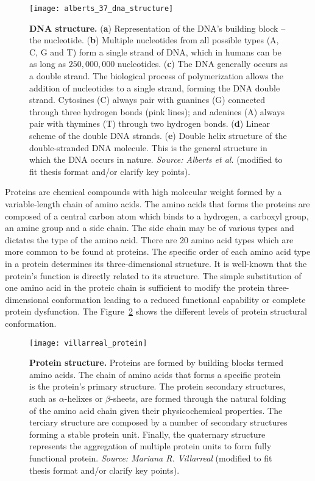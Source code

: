 \begin{figure}[h!]
\centering
\texttt{[image: alberts\_37\_dna\_structure]}
\caption[DNA structure]{\textbf{DNA structure.} (\textbf{a}) Representation of the DNA's building block -- the nucleotide. (\textbf{b}) Multiple nucleotides from all possible types (A, C, G and T) form a single strand of DNA, which in humans can be as long as \approxy$250,000,000$ nucleotides. (\textbf{c}) The DNA generally occurs as a double strand. The biological process of polymerization allows the addition of nucleotides to a single strand, forming the DNA double strand. Cytosines (C) always pair with guanines (G) connected through three hydrogen bonds (pink lines); and adenines (A) always pair with thymines (T) through two hydrogen bonds. (\textbf{d}) Linear scheme of the double DNA strands. (\textbf{e}) Double helix structure of the double-stranded DNA molecule. This is the general structure in which the DNA occurs in nature. \emph{Source: Alberts et al.}\cite{alberts2007} (modified to fit thesis format and/or clarify key points).}
\label{fig:alberts_dna_structure}
\end{figure}

Proteins are chemical compounds with high molecular weight formed by a variable-length chain of amino acids. The amino acids that forms the proteins are composed of a central carbon atom which binds to a hydrogen, a carboxyl group, an amine group and a side chain. The side chain may be of various types and dictates the type of the amino acid. There are 20 amino acid types which are more common to be found at proteins. The specific order of each amino acid type in a protein determines its three-dimensional structure. It is well-known that the protein's function is directly related to its structure. The simple substitution of one amino acid in the proteic chain is sufficient to modify the protein three-dimensional conformation leading to a reduced functional capability or complete protein dysfunction. The Figure~\ref{fig:villarreal_protein} shows the different levels of protein structural conformation.

\begin{figure}[h!]
\centering
\texttt{[image: villarreal\_protein]}
\caption[Protein structure]{\textbf{Protein structure.} Proteins are formed by building blocks termed amino acids. The chain of amino acids that forms a specific protein is the protein's primary structure. The protein secondary structures, such as $\alpha$-helixes or $\beta$-sheets, are formed through the natural folding of the amino acid chain given their physicochemical properties. The terciary structure are composed by a number of secondary structures forming a stable protein unit. Finally, the quaternary structure represents the aggregation of multiple protein units to form fully functional protein. \emph{Source: Mariana R. Villarreal} (modified to fit thesis format and/or clarify key points).}
\label{fig:villarreal_protein}
\end{figure}

